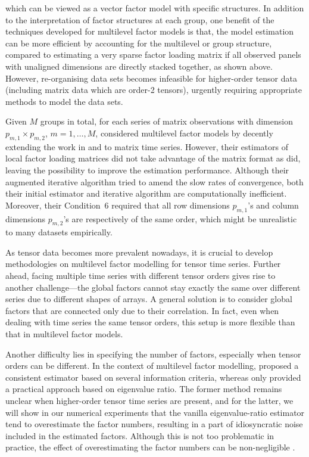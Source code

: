 \documentclass[aos]{imsart}
\theoremstyle{plain}
\theoremstyle{definition}
\begin{document}
which can be viewed as a vector factor model with specific structures. In addition to the interpretation of factor structures at each group, one benefit of the techniques developed for multilevel factor models is that, the model estimation can be more efficient by accounting for the multilevel or group structure, compared to estimating a very sparse factor loading matrix if all observed panels with unaligned dimensions are directly stacked together, as shown above. However, re-organising data sets becomes infeasible for higher-order tensor data (including matrix data which are order-2 tensors), urgently requiring appropriate methods to model the data sets.

Given $M$ groups in total, for each series of matrix observations with dimension $p_{m,1}\times p_{m,2}$, $m=1,\dots, M$, \cite{Zhangetal2025} considered multilevel factor models by decently extending the work in \cite{Wang2008} and \cite{Choietal2018} to matrix time series. However, their estimators of local factor loading matrices did not take advantage of the matrix format as \cite{yu2022projected} did, leaving the possibility to improve the estimation performance. Although their augmented iterative algorithm tried to amend the slow rates of convergence, both their initial estimator and iterative algorithm are computationally inefficient. Moreover, their Condition~6 required that all row dimensions $p_{m,1}$'s and column dimensions $p_{m,2}$'s are respectively of the same order, which might be unrealistic to many datasets empirically.

As tensor data becomes more prevalent nowadays, it is crucial to develop methodologies on multilevel factor modelling for tensor time series. Further ahead, facing multiple time series with different tensor orders gives rise to another challenge---the global factors cannot stay exactly the same over different series due to different shapes of arrays. A general solution is to consider global factors that are connected only due to their correlation. In fact, even when dealing with time series the same tensor orders, this setup is more flexible than that in multilevel factor models.

Another difficulty lies in specifying the number of factors, especially when tensor orders can be different. In the context of multilevel factor modelling, \cite{Choietal2018} proposed a consistent estimator based on several information criteria, whereas \cite{Zhangetal2025} only provided a practical approach based on eigenvalue ratio. The former method remains unclear when higher-order tensor time series are present, and for the latter, we will show in our numerical experiments that the vanilla eigenvalue-ratio estimator tend to overestimate the factor numbers, resulting in a part of idiosyncratic noise included in the estimated factors. Although this is not too problematic in practice, the effect of overestimating the factor numbers can be non-negligible \citep{BarigozziCho2020}.
\end{document}
